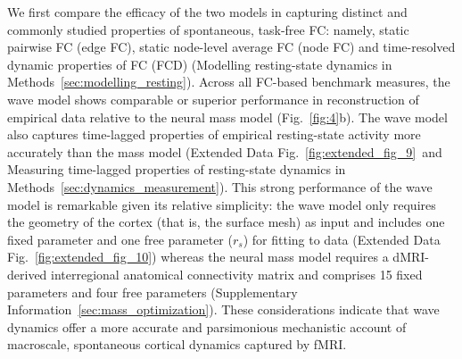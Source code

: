 \documentclass[sn-mathphys-num]{sn-jnl}%
\theoremstyle{thmstyleone}%
\theoremstyle{thmstyletwo}%
\theoremstyle{thmstylethree}%
\begin{document}
We first compare the efficacy of the two models in capturing distinct and commonly studied properties of spontaneous, task-free FC: namely, static pairwise FC (edge FC), static node-level average FC (node FC) and time-resolved dynamic properties of FC (FCD) (Modelling resting-state dynamics in Methods~\ref{sec:modelling_resting}). 
Across all FC-based benchmark measures, the wave model shows comparable or superior performance in reconstruction of empirical data relative to the neural mass model (Fig.~\ref{fig:4}b). 
The wave model also captures time-lagged properties\cite{raut2021global,bolt2022parsimonious,mitra2015lag} of empirical resting-state activity more accurately than the mass model (Extended Data Fig.~\ref{fig:extended_fig_9}~and Measuring time-lagged properties of resting-state dynamics in Methods~\ref{sec:dynamics_measurement}). 
This strong performance of the wave model is remarkable given its relative simplicity: the wave model only requires the geometry of the cortex (that is, the surface mesh) as input and includes one fixed parameter and one free parameter ($ r_s $) for fitting to data (Extended Data Fig.~\ref{fig:extended_fig_10}) whereas the neural mass model requires a dMRI-derived interregional anatomical connectivity matrix and comprises 15 fixed parameters and four free parameters (Supplementary Information~\ref{sec:mass_optimization}). 
These considerations indicate that wave dynamics offer a more accurate and parsimonious mechanistic account of macroscale, spontaneous cortical dynamics captured by fMRI.
\end{document}
